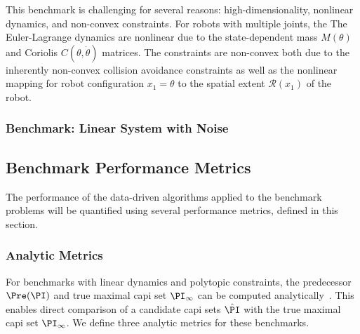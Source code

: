 This benchmark is challenging for several reasons: high-dimensionality, nonlinear dynamics, and non-convex constraints. 
For robots with multiple joints, the 
The Euler-Lagrange dynamics are nonlinear due to the state-dependent mass $M(\theta)$ and Coriolis $C(\theta,\dot{\theta})$ matrices. 
The constraints are non-convex both due to the inherently non-convex collision avoidance constraints as well as the nonlinear mapping for robot configuration $x_1 = \theta$ to the spatial extent $\mathcal{R}(x_1)$ of the robot. 

\subsubsection{Benchmark: Linear System with Noise}



\subsection{Benchmark Performance Metrics}

The performance of the data-driven algorithms applied to the benchmark problems will be quantified using several performance metrics, defined in this section.

\subsubsection{Analytic Metrics}

For benchmarks with linear dynamics and polytopic constraints, the predecessor $\Pre(\PI)$ and true maximal \ac{capi} set $\PI_\infty$ can be computed analytically~\cite{}. This enables direct comparison of a candidate \ac{capi} sets $\hat{\PI}$ with the true maximal \ac{capi} set $\PI_\infty$. We define three analytic metrics for these benchmarks. 


